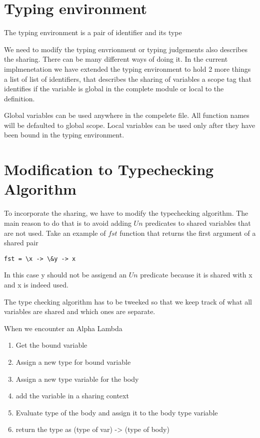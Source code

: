 \section{Typing environment}

The typing environment is a pair of identifier and its type

We need to modify the typing envrionment or typing judgements
also describes the sharing. There can be many different
ways of doing it.
In the current implmenetation we have
extended the typing environment to hold 2 more things
a list of list of identifiers, that describes the sharing of variables
a scope tag that identifies if the variable is global in the complete module or local to the definition.

Global variables can be used anywhere in the compelete file.
All function names will be defaulted to global scope.
Local variables can be used only after they have been bound in the typing environment.





\section{Modification to Typechecking Algorithm}

To incorporate the sharing, we have to modify the typechecking algorithm.
The main reason to do that is to avoid adding $Un$ predicates to
shared variables that are not used. Take an example of $fst$ function
that returns the first argument of a shared pair
\begin{verbatim}
fst = \x -> \&y -> x
\end{verbatim}
In this case y should not be assigend an $Un$ predicate because
it is shared with x and x is indeed used.

The type checking algorithm has to be tweeked so that we keep track
of what all variables are shared and which ones are separate.

When we encounter an Alpha Lambda
\begin{enumerate}
\item Get the bound variable
\item Assign a new type for bound variable
\item Assign a new type variable for the body
\item add the variable in a sharing context
\item Evaluate type of the body and assign it to the body type variable
\item return the type as (type of var) -> (type of body)
\end{enumerate}


